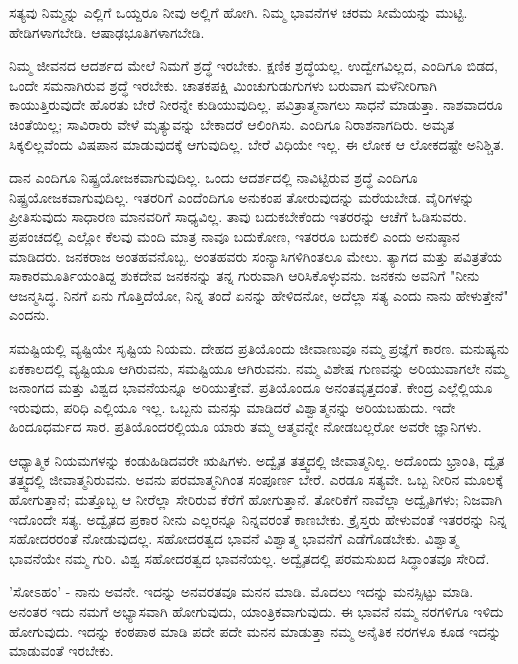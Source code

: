 ಸತ್ಯವು ನಿಮ್ಮನ್ನು ಎಲ್ಲಿಗೆ ಒಯ್ದರೂ ನೀವು ಅಲ್ಲಿಗೆ ಹೋಗಿ. ನಿಮ್ಮ ಭಾವನೆಗಳ ಚರಮ ಸೀಮೆಯನ್ನು ಮುಟ್ಟಿ. ಹೇಡಿಗಳಾಗಬೇಡಿ. ಆಷಾಢಭೂತಿಗಳಾಗಬೇಡಿ.

ನಿಮ್ಮ ಜೀವನದ ಆದರ್ಶದ ಮೇಲೆ ನಿಮಗೆ ಶ್ರದ್ಧೆ ಇರಬೇಕು. ಕ್ಷಣಿಕ ಶ್ರದ್ಧೆಯಲ್ಲ. ಉದ್ವೇಗವಿಲ್ಲದ, ಎಂದಿಗೂ ಬಿಡದ, ಒಂದೇ ಸಮನಾಗಿರುವ ಶ್ರದ್ಧೆ ಇರಬೇಕು. ಚಾತಕಪಕ್ಷಿ ಮಿಂಚುಗುಡುಗುಗಳು ಬರುವಾಗ ಮಳೆನೀರಿಗಾಗಿ ಕಾಯುತ್ತಿರುವುದೇ ಹೊರತು ಬೇರೆ ನೀರನ್ನೇ ಕುಡಿಯುವುದಿಲ್ಲ. ಪವಿತ್ರಾತ್ಮನಾಗಲು ಸಾಧನೆ ಮಾಡುತ್ತಾ. ನಾಶವಾದರೂ ಚಿಂತೆಯಿಲ್ಲ; ಸಾವಿರಾರು ವೇಳೆ ಮೃತ್ಯುವನ್ನು ಬೇಕಾದರೆ ಆಲಿಂಗಿಸು. ಎಂದಿಗೂ ನಿರಾಶನಾಗದಿರು. ಅಮೃತ ಸಿಕ್ಕಲಿಲ್ಲವೆಂದು ವಿಷಪಾನ ಮಾಡುವುದಕ್ಕೆ ಆಗುವುದಿಲ್ಲ. ಬೇರೆ ವಿಧಿಯೇ ಇಲ್ಲ. ಈ ಲೋಕ ಆ ಲೋಕದಷ್ಟೇ ಅನಿಶ್ಚಿತ.

ದಾನ ಎಂದಿಗೂ ನಿಷ್ಪ್ರಯೋಜಕವಾಗುವುದಿಲ್ಲ. ಒಂದು ಆದರ್ಶದಲ್ಲಿ ನಾವಿಟ್ಟಿರುವ ಶ್ರದ್ಧೆ ಎಂದಿಗೂ ನಿಷ್ಪ್ರಯೋಜಕವಾಗುವುದಿಲ್ಲ. ಇತರರಿಗೆ ಎಂದೆಂದಿಗೂ ಅನುಕಂಪ ತೋರುವುದನ್ನು ಮರೆಯಬೇಡ. ವೈರಿಗಳನ್ನು ಪ್ರೀತಿಸುವುದು ಸಾಧಾರಣ ಮಾನವರಿಗೆ ಸಾಧ್ಯವಿಲ್ಲ. ತಾವು ಬದುಕಬೇಕೆಂದು ಇತರರನ್ನು ಆಚೆಗೆ ಓಡಿಸುವರು. ಪ್ರಪಂಚದಲ್ಲಿ ಎಲ್ಲೋ ಕೆಲವು ಮಂದಿ ಮಾತ್ರ ನಾವೂ ಬದುಕೋಣ, ಇತರರೂ ಬದುಕಲಿ ಎಂದು ಅನುಷ್ಠಾನ ಮಾಡಿದರು. ಜನಕರಾಜ ಅಂತಹವನೊಬ್ಬ. ಅಂತಹವರು ಸಂನ್ಯಾಸಿಗಳಿಗಿಂತಲೂ ಮೇಲು. ತ್ಯಾಗದ ಮತ್ತು ಪವಿತ್ರತೆಯ ಸಾಕಾರಮೂರ್ತಿಯಂತಿದ್ದ ಶುಕದೇವ ಜನಕನನ್ನು ತನ್ನ ಗುರುವಾಗಿ ಆರಿಸಿಕೊಳ್ಳುವನು. ಜನಕನು ಅವನಿಗೆ "ನೀನು ಆಜನ್ಮಸಿದ್ಧ. ನಿನಗೆ ಏನು ಗೊತ್ತಿದೆಯೋ, ನಿನ್ನ ತಂದೆ ಏನನ್ನು ಹೇಳಿದನೋ, ಅದೆಲ್ಲಾ ಸತ್ಯ ಎಂದು ನಾನು ಹೇಳುತ್ತೇನೆ" ಎಂದನು.

ಸಮಷ್ಟಿಯಲ್ಲಿ ವ್ಯಷ್ಟಿಯೇ ಸೃಷ್ಟಿಯ ನಿಯಮ. ದೇಹದ ಪ್ರತಿಯೊಂದು ಜೀವಾಣುವೂ  ನಮ್ಮ ಪ್ರಜ್ಞೆಗೆ ಕಾರಣ. ಮನುಷ್ಯನು ಏಕಕಾಲದಲ್ಲಿ ವ್ಯಷ್ಟಿಯೂ ಆಗಿರುವನು, ಸಮಷ್ಟಿಯೂ ಆಗಿರುವನು. ನಮ್ಮ ವಿಶೇಷ ಗುಣವನ್ನು ಅರಿಯುವಾಗಲೇ ನಮ್ಮ ಜನಾಂಗದ ಮತ್ತು ವಿಶ್ವದ ಭಾವನೆಯನ್ನೂ ಅರಿಯುತ್ತೇವೆ. ಪ್ರತಿಯೊಂದೂ ಅನಂತವೃತ್ತದಂತೆ. ಕೇಂದ್ರ ಎಲ್ಲೆಲ್ಲಿಯೂ ಇರುವುದು, ಪರಿಧಿ ಎಲ್ಲಿಯೂ ಇಲ್ಲ. ಒಬ್ಬನು ಮನಸ್ಸು ಮಾಡಿದರೆ ವಿಶ್ವಾತ್ಮನನ್ನು ಅರಿಯಬಹುದು. ಇದೇ ಹಿಂದೂಧರ್ಮದ ಸಾರ. ಪ್ರತಿಯೊಂದರಲ್ಲಿಯೂ ಯಾರು ತಮ್ಮ ಆತ್ಮವನ್ನೇ ನೋಡಬಲ್ಲರೋ ಅವರೇ ಜ್ಞಾನಿಗಳು.

ಆಧ್ಯಾತ್ಮಿಕ ನಿಯಮಗಳನ್ನು ಕಂಡುಹಿಡಿದವರೇ ಋಷಿಗಳು. ಅದ್ವೈತ ತತ್ತ್ವದಲ್ಲಿ ಜೀವಾತ್ಮನಿಲ್ಲ. ಅದೊಂದು ಭ್ರಾಂತಿ, ದ್ವೈತ ತತ್ತ್ವದಲ್ಲಿ ಜೀವಾತ್ಮನಿರುವನು. ಅವನು ಪರಮಾತ್ಮನಿಗಿಂತ ಸಂಪೂರ್ಣ ಬೇರೆ. ಎರಡೂ ಸತ್ಯವೇ. ಒಬ್ಬ ನೀರಿನ ಮೂಲಕ್ಕೆ ಹೋಗುತ್ತಾನೆ; ಮತ್ತೊಬ್ಬ ಆ ನೀರೆಲ್ಲಾ ಸೇರಿರುವ ಕೆರೆಗೆ ಹೋಗುತ್ತಾನೆ. ತೋರಿಕೆಗೆ ನಾವೆಲ್ಲಾ ಅದ್ವೈತಿಗಳು; ನಿಜವಾಗಿ ಇದೊಂದೇ ಸತ್ಯ. ಅದ್ವೈತದ ಪ್ರಕಾರ ನೀನು ಎಲ್ಲರನ್ನೂ ನಿನ್ನವರಂತೆ ಕಾಣಬೇಕು. ಕ್ರೈಸ್ತರು ಹೇಳುವಂತೆ ಇತರರನ್ನು ನಿನ್ನ ಸಹೋದರರಂತೆ ನೋಡುವುದಲ್ಲ. ಸಹೋದರತ್ವದ ಭಾವನೆ ವಿಶ್ವಾತ್ಮ ಭಾವನೆಗೆ ಎಡೆಗೊಡಬೇಕು. ವಿಶ್ವಾತ್ಮ ಭಾವನೆಯೇ ನಮ್ಮ ಗುರಿ. ವಿಶ್ವ ಸಹೋದರತ್ವದ ಭಾವನೆಯಲ್ಲ. ಅದ್ವೈತದಲ್ಲಿ ಪರಮಸುಖದ ಸಿದ್ಧಾಂತವೂ ಸೇರಿದೆ.

'ಸೋಽಹಂ' - ನಾನು ಅವನೇ. ಇದನ್ನು ಅನವರತವೂ ಮನನ ಮಾಡಿ. ಮೊದಲು ಇದನ್ನು ಮನಸ್ಸಿಟ್ಟು ಮಾಡಿ. ಅನಂತರ ಇದು ನಮಗೆ ಅಭ್ಯಾಸವಾಗಿ ಹೋಗುವುದು, ಯಾಂತ್ರಿಕವಾಗುವುದು. ಈ ಭಾವನೆ ನಮ್ಮ ನರಗಳಿಗೂ ಇಳಿದು ಹೋಗುವುದು. ಇದನ್ನು ಕಂಠಪಾಠ ಮಾಡಿ ಪದೇ ಪದೇ ಮನನ ಮಾಡುತ್ತಾ ನಮ್ಮ ಅನೈತಿಕ ನರಗಳೂ ಕೂಡ ಇದನ್ನು ಮಾಡುವಂತೆ ಇರಬೇಕು.

